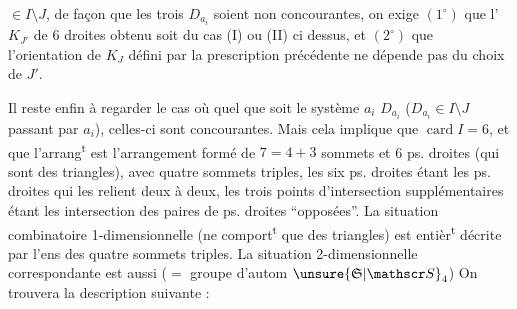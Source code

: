  $\in I\setminus J$, de façon que les trois
$D_{a_i}$ soient non concourantes, on exige
$(1^\circ)$ que l' $K_{J'}$ de 6 droites obtenu
soit du cas (I) ou (II) ci dessus, et
$(2^\circ)$ que l'orientation de $K_J$ défini par la
prescription précédente ne dépende pas du
choix de $J'$.

Il reste enfin à regarder le cas où
quel que soit le système $a_i$ $D_{a_i}$ ($D_{a_i}\in I\setminus J$
passant par $a_i$), celles-ci sont concourantes.
Mais cela implique que  $\operatorname{card} I=6$,
et que l'arrang\textsuperscript{t} est  l'arrangement
  formé de $7=4+3$ sommets
et 6 ps. droites (qui sont des triangles),
avec quatre sommets triples, les six ps.
droites étant les ps. droites qui les relient
deux à deux, les trois points d'intersection
supplémentaires étant les intersection des
paires de ps. droites ``opposées''. La situation
combinatoire 1-dimensionnelle (ne comport\textsuperscript{t}
que des triangles) est entièr\textsuperscript{t} décrite
par l'ens des quatre sommets triples.
La situation 2-dimensionnelle correspondante
est aussi  ($=$ groupe d'autom $\unsure{\mathfrak S|\mathscr S}_4$)
On trouvera la description suivante :
